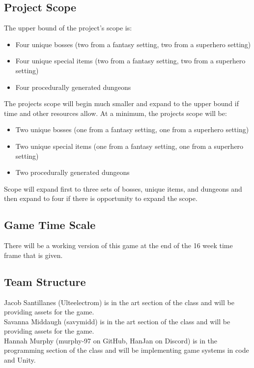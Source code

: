 \documentclass[titlepage]{article}
\begin{document}
\subsection*{Project Scope}
The upper bound of the project's scope is:
\begin{itemize}
    \item Four unique bosses (two from a fantasy setting, two from a superhero setting)
    \item Four unique special items (two from a fantasy setting, two from a superhero setting)
    \item Four procedurally generated dungeons
\end{itemize}

The projects scope will begin much smaller and expand to the upper bound if time
and other resources allow. At a minimum, the projects scope will be:
\begin{itemize}
    \item Two unique bosses (one from a fantasy setting, one from a superhero setting)
    \item Two unique special items (one from a fantasy setting, one from a superhero setting)
    \item Two procedurally generated dungeons
\end{itemize}

Scope will expand first to three sets of bosses, unique items, and dungeons and
then expand to four if there is opportunity to expand the scope.

\subsection*{Game Time Scale}
There will be a working version of this game at the end of the 16 week time 
frame that is given.

\subsection*{Team Structure}
Jacob Santillanes (Ulteelectrom) is in the art section of the class and will be 
providing assets for the game. \\

Savanna Middaugh (savymidd) is in the art section of the class and will be 
providing assets for the game. \\

Hannah Murphy (murphy-97 on GitHub, HanJan on Discord) is in the programming
section of the class and will be implementing game systems in code and Unity.
\end{document}
